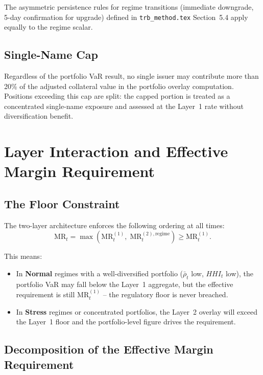 \documentclass[12pt, a4paper]{article}
\newcommand{\MR}{\mathrm{MR}}
\begin{document}
\noindent The asymmetric persistence rules for regime transitions (immediate
downgrade, 5-day confirmation for upgrade) defined in \texttt{trb\_method.tex}
Section~5.4 apply equally to the regime scalar.

\subsection{Single-Name Cap}

Regardless of the portfolio VaR result, no single issuer may contribute
more than 20\% of the adjusted collateral value in the portfolio overlay
computation. Positions exceeding this cap are split: the capped portion
is treated as a concentrated single-name exposure and assessed at the
Layer~1 rate without diversification benefit.

\section{Layer Interaction and Effective Margin Requirement}
\label{sec:interaction}

\subsection{The Floor Constraint}

The two-layer architecture enforces the following ordering at all times:
\begin{equation}
    \MR_t = \max\!\left(\MR_t^{(1)},\; \MR_t^{(2),\mathrm{regime}}\right)
    \geq \MR_t^{(1)}.
    \label{eq:floor_constraint}
\end{equation}

This means:
\begin{itemize}[leftmargin=1.5em]
    \item In \textbf{Normal} regimes with a well-diversified portfolio
    ($\bar{\rho}_t$ low, $HHI_t$ low), the portfolio VaR may fall
    below the Layer~1 aggregate, but the effective requirement is still
    $\MR_t^{(1)}$ -- the regulatory floor is never breached.
    \item In \textbf{Stress} regimes or concentrated portfolios, the Layer~2
    overlay will exceed the Layer~1 floor and the portfolio-level figure
    drives the requirement.
\end{itemize}

\subsection{Decomposition of the Effective Margin Requirement}
\end{document}
